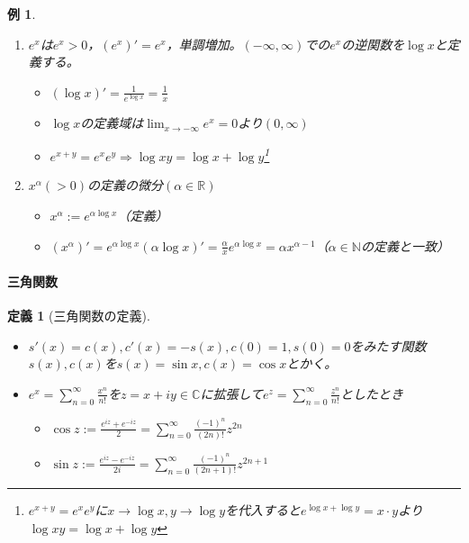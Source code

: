 \documentclass[dvipdfmx,a4j,10pt]{jsarticle}
\theoremstyle{mystyle1}
\newtheorem{example}[dfn]{例}
\theoremstyle{mystyle2}
\newtheorem{dfn*}{定義}
\begin{document}
\begin{example}　
    \begin{enumerate}
    \item $e^x$は$e^x>0$，$(e^x)'=e^x$，単調増加。$(-\infty , \infty)$での$e^x$の逆関数を$\log x$と定義する。
    \begin{itemize}
        \item $\displaystyle (\log x)'=\frac{1}{e^{\log x}}=\frac{1}{x}$
        \item $\log x$の定義域は$\displaystyle \lim_{x\to -\infty}e^x=0$より$(0,\infty)$
        \item $e^{x+y}=e^xe^y \Rightarrow \log{xy}=\log{x}+\log{y}$\footnote{$e^{x+y}=e^xe^y$に$x\to\log{x},y\to\log{y}$を代入すると$e^{\log{x}+\log{y}}=x\cdot y$より$\log{xy}=\log{x}+\log{y}$}
    \end{itemize}
    \item $x^\alpha(>0)$の定義の微分$(\alpha\in\mathbb{R})$
    \begin{itemize}
        \item $x^\alpha:=e^{\alpha\log{x}}$（定義）
        \item $(x^\alpha)'=e^{\alpha\log{x}}(\alpha\log{x})'=\frac{\alpha}{x}e^{\alpha\log{x}}=\alpha x^{\alpha-1}$（$\alpha\in\mathbb{N}$の定義と一致）
    \end{itemize}
    \end{enumerate}
\end{example}

\newpage

\paragraph{三角関数}
\begin{dfn*}[三角関数の定義]
    \begin{itemize}
    \item $s'(x)=c(x),c'(x)=-s(x),c(0)=1,s(0)=0$をみたす関数$s(x),c(x)$を$s(x)=\sin{x},c(x)=\cos{x}$とかく。
    \item $\displaystyle e^x=\sum_{n=0}^{\infty}\frac{x^n}{n!}$を$z=x+iy\in\mathbb{C}$に拡張して$\displaystyle e^z=\sum_{n=0}^{\infty}\frac{z^n}{n!}$としたとき
    \begin{itemize}
    \item $\displaystyle\cos{z}:=\frac{e^{iz}+e^{-iz}}{2}=\sum_{n=0}^{\infty}\frac{(-1)^n}{(2n)!}z^{2n}$
    \item $\displaystyle\sin{z}:=\frac{e^{iz}-e^{-iz}}{2i}=\sum_{n=0}^{\infty}\frac{(-1)^n}{(2n+1)!}z^{2n+1}$
    \end{itemize}
    \end{itemize}
\end{dfn*}
\end{document}
